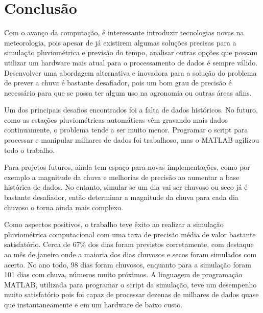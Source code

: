 \chapter{Conclusão}
\label{c.conclusao}
Com o avanço da computação, é interessante introduzir tecnologias novas na meteorologia, pois apesar de já existirem algumas soluções precisas para a simulação pluviométrica e previsão do tempo, analisar outras opções que possam utilizar um hardware mais atual para o processamento de dados é sempre válido. Desenvolver uma abordagem alternativa e inovadora para a solução do problema de prever a chuva é bastante desafiador, pois um bom grau de precisão é necessário para que se possa ter algum uso na agronomia ou outras áreas afins.

Um dos principais desafios encontrados foi a falta de dados históricos. No futuro, como as estações pluviométricas automáticas vêm gravando mais dados continuamente, o problema tende a ser muito menor. Programar o script para processar e manipular milhares de dados foi trabalhoso, mas o MATLAB agilizou todo o trabalho.

Para projetos futuros, ainda tem espaço para novas implementações, como por exemplo a magnitude da chuva e melhorias de precisão ao aumentar a base histórica de dados. No entanto, simular se um dia vai ser chuvoso ou seco já é bastante desafiador, então determinar a magnitude da chuva para cada dia chuvoso o torna ainda mais complexo.

Como aspectos positivos, o trabalho teve êxito ao realizar a simulação pluviométrica computacional com uma taxa de precisão média de valor bastante satisfatório. Cerca de 67\% dos dias foram previstos corretamente, com destaque ao mês de janeiro onde a maioria dos dias chuvosos e secos foram simulados com acerto. No ano todo, 98 dias foram chuvosos, enquanto para a simulação foram 101 dias com chuva, números muito próximos. A linguagem de programação MATLAB, utilizada para programar o script da simulação, teve um desempenho muito satisfatório pois foi capaz de processar dezenas de milhares de dados quase que instantaneamente e em um hardware de baixo custo.